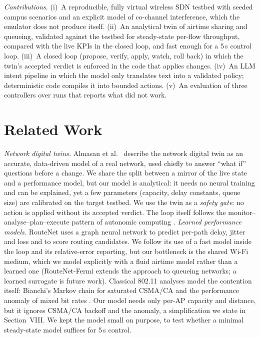 \documentclass[conference]{IEEEtran}
\begin{document}
\emph{Contributions.}
(i)~A reproducible, fully virtual wireless SDN testbed with seeded campus scenarios and an explicit model of co-channel interference, which the emulator does not produce itself.
(ii)~An analytical twin of airtime sharing and queueing, validated against the testbed for steady-state per-flow throughput, compared with the live KPIs in the closed loop, and fast enough for a 5\,s control loop.
(iii)~A closed loop (propose, verify, apply, watch, roll back) in which the twin's accepted verdict is enforced in the code that applies changes.
(iv)~An LLM intent pipeline in which the model only translates text into a validated policy; deterministic code compiles it into bounded actions.
(v)~An evaluation of three controllers over \NumRuns{} runs that reports what did not work.

\section{Related Work}
\emph{Network digital twins.} Almasan et al.\ \cite{almasan2022} describe the network digital twin as an accurate, data-driven model of a real network, used chiefly to answer ``what if'' questions before a change. We share the split between a mirror of the live state and a performance model, but our model is analytical: it needs no neural training and can be explained, yet a few parameters (capacity, delay constants, queue size) are calibrated on the target testbed. We use the twin as a \emph{safety gate}: no action is applied without its accepted verdict. The loop itself follows the monitor--analyse--plan--execute pattern of autonomic computing \cite{kephart2003}.
\emph{Learned performance models.} RouteNet \cite{rusek2020} uses a graph neural network to predict per-path delay, jitter and loss and to score routing candidates. We follow its use of a fast model inside the loop and its relative-error reporting, but our bottleneck is the shared Wi-Fi medium, which we model explicitly with a fluid airtime model rather than a learned one (RouteNet-Fermi \cite{ferriol2023} extends the approach to queueing networks; a learned surrogate is future work). Classical 802.11 analyses model the contention itself: Bianchi's Markov chain \cite{bianchi2000} for saturated CSMA/CA and the performance anomaly of mixed bit rates \cite{heusse2003}. Our model needs only per-AP capacity and distance, but it ignores CSMA/CA backoff and the anomaly, a simplification we state in Section~VIII. We kept the model small on purpose, to test whether a minimal steady-state model suffices for 5\,s control.
\end{document}
